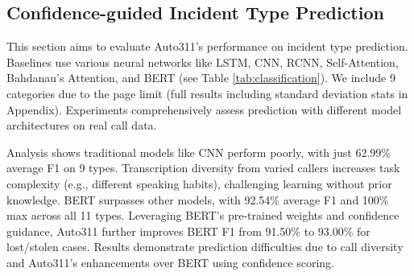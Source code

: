 

\subsection{Confidence-guided Incident Type Prediction}

This section aims to evaluate Auto311's performance on incident type prediction. Baselines use various neural networks like LSTM, CNN, RCNN, Self-Attention, Bahdanau's Attention, and BERT \cite{hochreiter1997long, kim2014convolutional, lai2015recurrent, vaswani2017attention, bahdanau2014neural, wolf2019huggingface}(see Table \ref{tab:classification}). We include 9 categories due to the page limit (full results including standard deviation stats in Appendix). Experiments comprehensively assess prediction with different model architectures on real call data.



Analysis shows traditional models like CNN perform poorly, with just 62.99\% average F1 on 9 types. Transcription diversity from varied callers increases task complexity (e.g., different speaking habits), challenging learning without prior knowledge. BERT surpasses other models, with 92.54\% average F1 and 100\% max across all 11 types. Leveraging BERT's pre-trained weights and confidence guidance, Auto311 further improves BERT F1 from 91.50\% to 93.00\% for lost/stolen cases. Results demonstrate prediction difficulties due to call diversity and Auto311's enhancements over BERT using confidence scoring.

